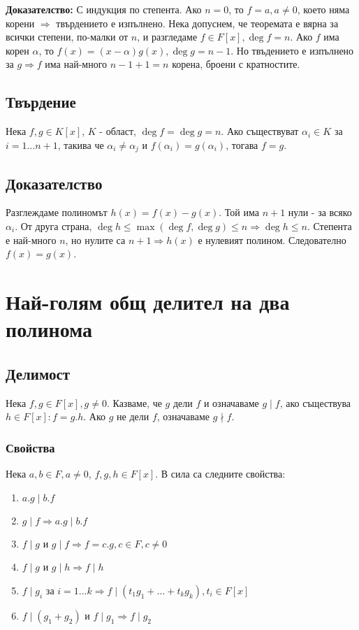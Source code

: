 \documentclass[fleqn,12pt]{article}
\begin{document}
\textbf{Доказателство: } С индукция по степента. Ако $n = 0$, то $f = a, a \neq 0$, което няма корени $\Rightarrow$
твърдението е изпълнено. Нека допуснем, че теоремата е вярна за всички степени, по-малки от $n$, и разгледаме 
$f \in F[x], \deg f = n$. Ако $f$ има корен $\alpha$, то $f(x) = (x - \alpha) g(x), \deg g = n - 1$.
Но твъдението е изпълнено за $g \Rightarrow f$ има най-много $n - 1 + 1 = n$ корена, броени с кратностите. 


\subsection{Твърдение}
Нека $f,g \in K[x]$, $K$ - област, $\deg f = \deg g = n$. Ако съществуват 
$\alpha_i \in K$ за $i=1 \dots n+1$, такива че $\alpha_i \neq \alpha_j$ и 
$f(\alpha_i) = g(\alpha_i)$, тогава $f = g$.

\subsection{Доказателство}
Разглеждаме полиномът $h(x) = f(x) - g(x)$. Той има $n + 1$ нули - за всяко $\alpha_i$.
От друга страна, $\deg h \leq \max(\deg f, \deg g) \leq n \Rightarrow \deg h \leq n$.
Степента е най-много $n$, но нулите са $n + 1 \Rightarrow h(x)$ е нулевият полином. 
Следователно $f(x) = g(x)$.

\section{Най-голям общ делител на два полинома}
\subsection{Делимост}
Нека $f,g \in F[x], g \neq 0$. Казваме, че $g$ дели $f$ и означаваме $g \mid f$,
ако съществува $h \in F[x] : f = g.h$. Ако $g$ не дели $f$, означаваме $g \nmid f$.

\subsubsection{Свойства}
Нека $a,b \in F, a \neq 0$, $f,g,h \in F[x]$. В сила са следните свойства:
\begin{enumerate}
    \item $a.g \mid b.f$
    \item $g \mid f \Rightarrow a.g \mid b.f$
    \item \label{div_prop:mutual_div} $f \mid g$ и $g \mid f \Rightarrow f = c.g, c \in F, c\neq 0$
    \item $f \mid g$ и $g \mid h \Rightarrow f \mid h$
    \item $f \mid g_i$ за $i = 1 \dots k \Rightarrow f \mid (t_1 g_1 + \dots + t_k g_k), t_i \in F[x]$
    \item \label{div_prop:sum} $f \mid (g_1 + g_2)$ и $f \mid g_1 \Rightarrow f \mid g_2$ 
\end{enumerate} 
\end{document}
